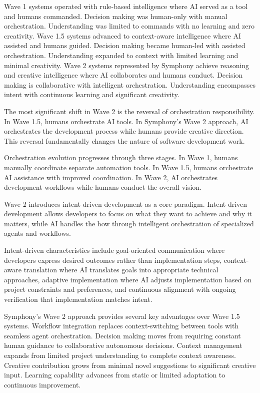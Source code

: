 Wave 1 systems operated with rule-based intelligence where AI served as a tool and humans commanded. Decision making was human-only with manual orchestration. Understanding was limited to commands with no learning and zero creativity. Wave 1.5 systems advanced to context-aware intelligence where AI assisted and humans guided. Decision making became human-led with assisted orchestration. Understanding expanded to context with limited learning and minimal creativity. Wave 2 systems represented by Symphony achieve reasoning and creative intelligence where AI collaborates and humans conduct. Decision making is collaborative with intelligent orchestration. Understanding encompasses intent with continuous learning and significant creativity.

The most significant shift in Wave 2 is the reversal of orchestration responsibility. In Wave 1.5, humans orchestrate AI tools. In Symphony's Wave 2 approach, AI orchestrates the development process while humans provide creative direction. This reversal fundamentally changes the nature of software development work.

Orchestration evolution progresses through three stages. In Wave 1, humans manually coordinate separate automation tools. In Wave 1.5, humans orchestrate AI assistance with improved coordination. In Wave 2, AI orchestrates development workflows while humans conduct the overall vision.

Wave 2 introduces intent-driven development as a core paradigm. Intent-driven development allows developers to focus on what they want to achieve and why it matters, while AI handles the how through intelligent orchestration of specialized agents and workflows.

Intent-driven characteristics include goal-oriented communication where developers express desired outcomes rather than implementation steps, context-aware translation where AI translates goals into appropriate technical approaches, adaptive implementation where AI adjusts implementation based on project constraints and preferences, and continuous alignment with ongoing verification that implementation matches intent.

Symphony's Wave 2 approach provides several key advantages over Wave 1.5 systems. Workflow integration replaces context-switching between tools with seamless agent orchestration. Decision making moves from requiring constant human guidance to collaborative autonomous decisions. Context management expands from limited project understanding to complete context awareness. Creative contribution grows from minimal novel suggestions to significant creative input. Learning capability advances from static or limited adaptation to continuous improvement.

